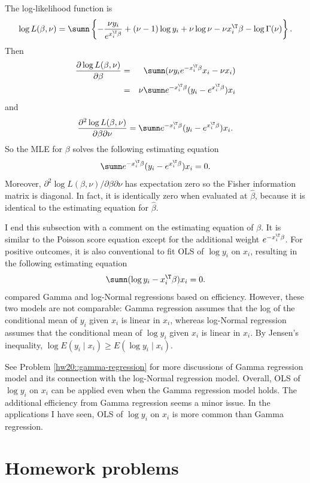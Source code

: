 The log-likelihood function is
$$
\log L(\beta, \nu) = 
\sumn \left\{ 
- \frac{  \nu y_i }{  e^{x_i^{\T} \beta} }  + (\nu - 1)\log y_i + \nu \log \nu - \nu x_i^{\T} \beta - \log\Gamma(\nu)
\right\} .
$$
Then
\begin{eqnarray*}
\frac{ \partial  \log L(\beta, \nu) }{\partial \beta } 
&=& 
\sumn ( \nu y_i e^{ - x_i^{\T} \beta}  x_i  - \nu x_i )  \\
&=& 
\nu \sumn e^{ - x_i^{\T} \beta}  (y_i -  e^{x_i^{\T} \beta}) x_i  
\end{eqnarray*}
and
$$
\frac{ \partial^2  \log L(\beta, \nu) }{\partial \beta \partial \nu } =
 \sumn e^{ - x_i^{\T} \beta}  (y_i -  e^{x_i^{\T} \beta}) x_i  .
$$
So the MLE for $\beta$ solves the following estimating equation
$$
\sumn e^{ - x_i^{\T} \beta}  (y_i -  e^{x_i^{\T} \beta}) x_i   = 0.
$$
Moreover,  $ \partial^2  \log L(\beta, \nu)  / \partial \beta \partial \nu  $ has expectation zero
so the Fisher information matrix is diagonal. In fact, it is identically zero when evaluated at $\hat\beta$, because it is identical to the estimating equation for $\hat\beta$. 

I end this subsection with a comment on the estimating equation of $\beta$. It is similar to the Poisson score equation except for the additional weight $e^{ - x_i^{\T} \beta} $. For positive outcomes, it is also conventional to fit OLS of $\log y_i$ on $x_i$, resulting in the following estimating equation
$$
\sumn    (\log y_i - x_i^{\T} \beta) x_i   = 0.
$$
\citet{firth1988multiplicative} compared  Gamma and log-Normal regressions based on efficiency. However, these two models are not  comparable: Gamma regression assumes that the log of the conditional mean of $y_i$ given $x_i$ is linear in $x_i$, whereas log-Normal regression assumes that the conditional mean of $\log y_i$ given $x_i$ is linear in $x_i$. By Jensen's inequality, $\log E(y_i\mid x_i)   \geq  E( \log y_i\mid x_i)  .$


See Problem \ref{hw20::gamma-regression} for more discussions of Gamma regression model and its connection with the log-Normal regression model. Overall, OLS of $\log y_i$ on $x_i$ can be applied even when the Gamma regression model holds. The additional efficiency from Gamma regression seems a minor issue. In the applications I have seen, OLS of $\log y_i$ on $x_i$ is more common than Gamma regression. 




\section{Homework problems}

